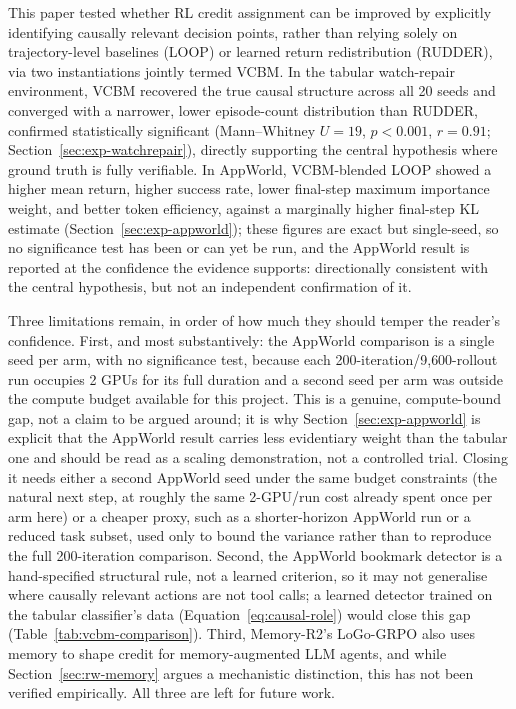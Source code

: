 \documentclass[conference]{IEEEtran}
\begin{document}
This paper tested whether RL credit assignment can be improved by explicitly identifying causally relevant decision points, rather than relying solely on trajectory-level baselines (LOOP) or learned return redistribution (RUDDER), via two instantiations jointly termed VCBM. In the tabular watch-repair environment, VCBM recovered the true causal structure across all 20 seeds and converged with a narrower, lower episode-count distribution than RUDDER, confirmed statistically significant (Mann--Whitney $U=19$, $p<0.001$, $r=0.91$; Section~\ref{sec:exp-watchrepair}), directly supporting the central hypothesis where ground truth is fully verifiable. In AppWorld, VCBM-blended LOOP showed a higher mean return, higher success rate, lower final-step maximum importance weight, and better token efficiency, against a marginally higher final-step KL estimate (Section~\ref{sec:exp-appworld}); these figures are exact but single-seed, so no significance test has been or can yet be run, and the AppWorld result is reported at the confidence the evidence supports: directionally consistent with the central hypothesis, but not an independent confirmation of it.

Three limitations remain, in order of how much they should temper the reader's confidence. First, and most substantively: the AppWorld comparison is a single seed per arm, with no significance test, because each 200-iteration/9{,}600-rollout run occupies 2 GPUs for its full duration and a second seed per arm was outside the compute budget available for this project. This is a genuine, compute-bound gap, not a claim to be argued around; it is why Section~\ref{sec:exp-appworld} is explicit that the AppWorld result carries less evidentiary weight than the tabular one and should be read as a scaling demonstration, not a controlled trial. Closing it needs either a second AppWorld seed under the same budget constraints (the natural next step, at roughly the same 2-GPU/run cost already spent once per arm here) or a cheaper proxy, such as a shorter-horizon AppWorld run or a reduced task subset, used only to bound the variance rather than to reproduce the full 200-iteration comparison. Second, the AppWorld bookmark detector is a hand-specified structural rule, not a learned criterion, so it may not generalise where causally relevant actions are not tool calls; a learned detector trained on the tabular classifier's data (Equation~\eqref{eq:causal-role}) would close this gap (Table~\ref{tab:vcbm-comparison}). Third, Memory-R2's LoGo-GRPO \cite{b_memoryr22026} also uses memory to shape credit for memory-augmented LLM agents, and while Section~\ref{sec:rw-memory} argues a mechanistic distinction, this has not been verified empirically. All three are left for future work.
\end{document}
